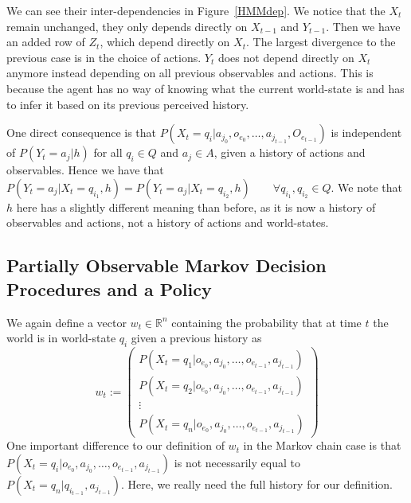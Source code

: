 \documentclass{article}
\theoremstyle{definition}
\def\mc{Markov chain}
\begin{document}
We can see their inter-dependencies in Figure~\ref{HMMdep}. We notice that the $X_t$ remain unchanged, they only depends directly on $X_{t-1}$ and $Y_{t-1}$. Then we have an added row of $Z_t$, which depend directly on $X_t$. The largest divergence to the previous case is in the choice of actions. $Y_t$ does not depend directly on $X_t$ anymore instead depending on all previous observables and actions. This is because the agent has no way of knowing what the current world-state is and has to infer it based on its previous perceived history. 

One direct consequence is that $P(X_t=q_i|a_{j_0},o_{e_0},\ldots,a_{j_{t-1}},O_{e_{t-1}})$ is independent of $P(Y_t=a_j|h)$ for all $q_i\in Q$ and $a_j\in A$, given a history of actions and observables. Hence we have that $P(Y_t=a_j|X_t=q_{i_1},h)=P(Y_t=a_j|X_t=q_{i_2},h) \qquad \forall q_{i_1},q_{i_2} \in Q$. 
We note that $h$ here has a slightly different meaning than before, as it is now a history of observables and actions, not a history of actions and world-states. 

\subsection{Partially Observable Markov Decision Procedures and a Policy}
We again define a vector $w_t\in \mathbb{R}^{n}$ containing the probability that at time $t$ the world is in world-state $q_i$ given a previous history as 
\[
w_t:=
\left ( 
\begin{matrix}
P(X_t=q_1|o_{e_0},a_{j_0},\ldots,o_{e_{t-1}},a_{j_{t-1}}) \\
P(X_t=q_2|o_{e_0},a_{j_0},\ldots,o_{e_{t-1}},a_{j_{t-1}}) \\
\vdots \\
P(X_t=q_n|o_{e_0},a_{j_0},\ldots,o_{e_{t-1}},a_{j_{t-1}}) 
\end{matrix}
\right )
\]
One important difference to our definition of $w_t$ in the {\mc} case is that $P(X_t=q_i|o_{e_0},a_{j_0},\ldots,o_{e_{t-1}},a_{j_{t-1}})$ is not necessarily equal to $P(X_t=q_n|q_{i_{t-1}},a_{j_{t-1}})$. Here, we really need the full history for our definition. 
\end{document}
